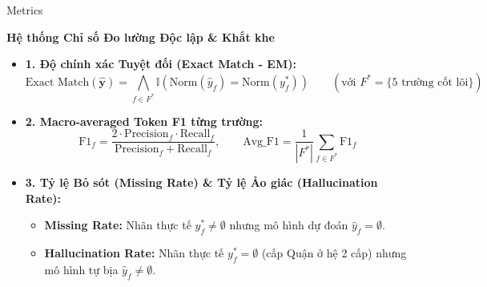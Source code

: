 \documentclass[aspectratio=169,9pt]{beamer}
\begin{document}
\begin{frame}{Metrics}
  \vspace{0.05cm}
  \centerline{\large\textbf{Hệ thống Chỉ số Đo lường Độc lập \& Khắt khe}}
  \vspace{0.2cm}

  \begin{itemize}
    \setlength{\itemsep}{5pt}
    \item \textbf{1. Độ chính xác Tuyệt đối (Exact Match - EM):}
      $$\text{Exact Match}(\hat{\mathbf{y}}) = \bigwedge_{f \in F^*} \mathbb{I}(\text{Norm}(\hat{y}_f) = \text{Norm}(y_f^*)) \qquad (\text{với } F^* = \{5 \text{ trường cốt lõi}\})$$
    \item \textbf{2. Macro-averaged Token F1 từng trường:}
      $$\text{F1}_f = \frac{2 \cdot \text{Precision}_f \cdot \text{Recall}_f}{\text{Precision}_f + \text{Recall}_f}, \qquad \text{Avg\_F1} = \frac{1}{|F^*|} \sum_{f \in F^*} \text{F1}_f$$
    \item \textbf{3. Tỷ lệ Bỏ sót (Missing Rate) \& Tỷ lệ Ảo giác (Hallucination Rate):}
      \begin{itemize}
        \setlength{\itemsep}{2.5pt}
        \item \textbf{Missing Rate:} Nhãn thực tế $y_f^* \ne \emptyset$ nhưng mô hình dự đoán $\hat{y}_f = \emptyset$.
        \item \textbf{Hallucination Rate:} Nhãn thực tế $y_f^* = \emptyset$ (cấp Quận ở hệ 2 cấp) nhưng mô hình tự bịa $\hat{y}_f \ne \emptyset$.
      \end{itemize}
  \end{itemize}
\end{frame}
\end{document}
